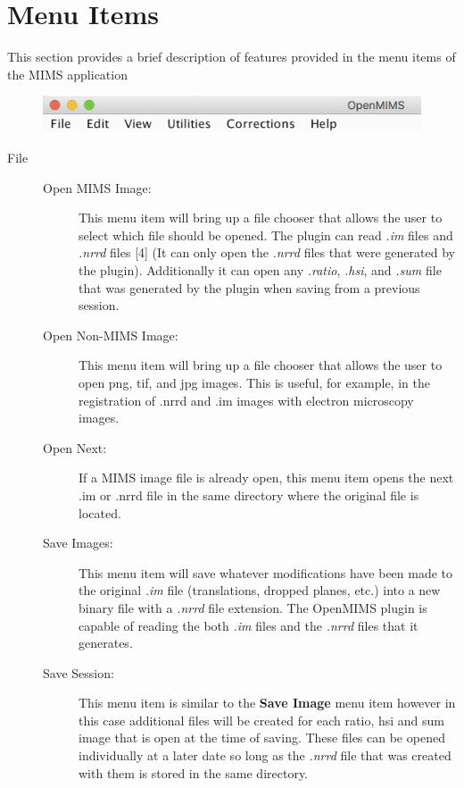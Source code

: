 \documentclass{article}
\begin{document}
\section*{Menu Items}
	\noindent This section provides a brief description of features provided in the menu items
	of the MIMS application
	\begin{figure}[ht]
	\includegraphics[scale=0.60]{snapshotMenuItems.png}
	\end{figure}
	\begin{description}
	
	\item[\large{File}] \indent                       
	
	\begin{description}
	
	\item[Open MIMS Image:] This menu item will bring up a file chooser that allows the user to select 
	which file should be opened. The plugin can read \textit{.im} files and \textit{.nrrd} files [4] (It 
	can only open the \textit{.nrrd} files that were generated by the plugin). Additionally it can open
	any \textit{.ratio}, \textit{.hsi}, and \textit{.sum} file that was generated by the plugin
	when saving from a previous session.
	
	\item[Open Non-MIMS Image:] This menu item will bring up a file chooser that allows the user to open
	png, tif, and jpg images.   This is useful, for example, in the registration of .nrrd and .im images with electron 
	microscopy images. 
	
	\item[Open Next:] If a MIMS image file is already open, this menu item opens the next .im or .nrrd file in the same
	directory where the original file is located.	
	
	\item[Save Images:]  This menu item will save whatever modifications have been made to the original
	\textit{.im} file (translations, dropped planes, etc.) into a new binary file with a \textit{.nrrd}
	file extension. The OpenMIMS plugin is capable of reading the both \textit{.im} files and the \textit{.nrrd}
	files that it generates.
	
	\item[Save Session:] This menu item is similar to the \textbf{Save Image} menu item however 
	in this case additional files will be created for each ratio, hsi and sum image that is 
	open at the time of saving. These files can be opened individually at a later date so long
	as the \textit{.nrrd} file that was created with them is stored in the same directory.
	

\end{description}
\end{description}
\end{document}
